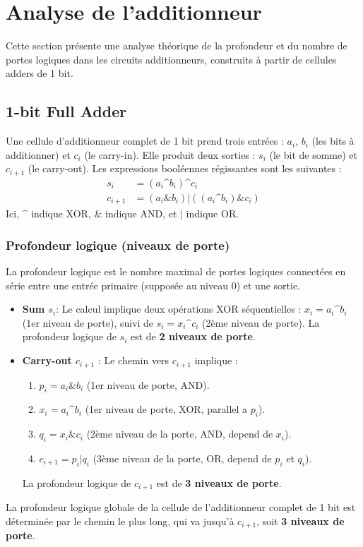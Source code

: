 \section{Analyse de l'additionneur}
Cette section présente une analyse théorique de la profondeur et du nombre de portes logiques dans les circuits additionneurs, construits à partir de cellules adders de 1 bit.

\subsection{1-bit Full Adder}
Une cellule d'additionneur complet de 1 bit prend trois entrées : $a_i$, $b_i$ (les bits à additionner) et $c_i$ (le carry-in). Elle produit deux sorties : $s_i$ (le bit de somme) et $c_{i+1}$ (le carry-out). Les expressions booléennes régissantes sont les suivantes :
\begin{align*}
    s_i &= (a_i \text{\textasciicircum} b_i) \text{\textasciicircum} c_i \\
    c_{i+1} &= (a_i \& b_i) | ((a_i \text{\textasciicircum} b_i) \& c_i)
\end{align*}
Ici, $\text{\textasciicircum}$ indique XOR, $\&$ indique AND, et $|$ indique OR.

\subsubsection{Profondeur logique (niveaux de porte)}
La profondeur logique est le nombre maximal de portes logiques connectées en série entre une entrée primaire (supposée au niveau 0) et une sortie.
\begin{itemize}
    \item \textbf{Sum $s_i$}:
    Le calcul implique deux opérations XOR séquentielles : $x_i = a_i \text{\textasciicircum} b_i$ (1er niveau de porte), suivi de $s_i = x_i \text{\textasciicircum} c_i$ (2ème niveau de porte). La profondeur logique de $s_i$ est de \textbf{2 niveaux de porte}.

    \item \textbf{Carry-out $c_{i+1}$} :
        Le chemin vers $c_{i+1}$ implique :
    \begin{enumerate}
        \item $p_i = a_i \& b_i$ (1er niveau de porte, AND).
        \item $x_i = a_i \text{\textasciicircum} b_i$ (1er niveau de porte, XOR, parallel a $p_i$).
        \item $q_i = x_i \& c_i$ (2ème niveau de la porte, AND, depend de $x_i$).
        \item $c_{i+1} = p_i | q_i$ (3ème niveau de la porte, OR, depend de $p_i$ et $q_i$).
    \end{enumerate}
     La profondeur logique de $c_{i+1}$ est de \textbf{3 niveaux de porte}.
\end{itemize}
La profondeur logique globale de la cellule de l'additionneur complet de 1 bit est déterminée par le chemin le plus long, qui va jusqu'à $c_{i+1}$, soit \textbf{3 niveaux de porte}.
